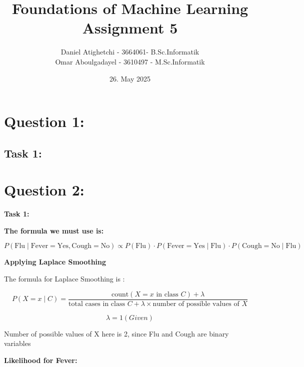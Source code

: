 \documentclass[a4paper,12pt]{article}
\title{Foundations of Machine Learning Assignment 5}
\date{ 26. May 2025}
\author{
Daniel Atighetchi - 3664061- B.Sc.Informatik \\
Omar Aboulgadayel - 3610497 - M.Sc.Informatik
}
\begin{document}
\doublespacing
\maketitle


\section*{Question 1: }

\subsection* {Task 1: }






\newpage



\section*{Question 2:}

\textbf{Task 1:}

\textbf{The formula we must use is:}

\[
P(\text{Flu} \mid \text{Fever} = \text{Yes}, \text{Cough} = \text{No}) 
\propto P(\text{Flu}) \cdot P(\text{Fever} = \text{Yes} \mid \text{Flu}) \cdot P(\text{Cough} = \text{No} \mid \text{Flu})
\]



\vspace{1cm}



\textbf {Applying Laplace Smoothing}

\vspace{1cm}

The formula for Laplace Smoothing is :

\[
P(X = x \mid C) = \frac{\text{count}(X = x \text{ in class } C) + \lambda}{\text{total cases in class } C + \lambda \times \text{number of possible values of } X}
\]


\[
\lambda = 1 (Given) 
\]

\vspace{0.5cm}

Number of possible values of X here is 2, since Flu and Cough are binary variables



\vspace{1cm}



\textbf{Likelihood for Fever:}
\end{document}
